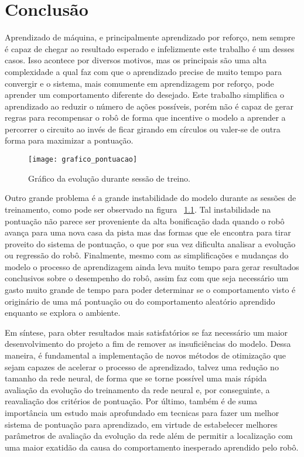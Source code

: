 

\chapter{Conclusão}
\label{cap:conclusao}

Aprendizado de máquina, e principalmente aprendizado por reforço, nem sempre é capaz de chegar ao resultado esperado e infelizmente este trabalho é um desses casos. Isso acontece por diversos motivos, mas os principais são uma alta complexidade a qual faz com que o aprendizado precise de muito tempo para convergir e o sistema, mais comumente em aprendizagem por reforço, pode aprender um comportamento diferente do desejado. Este trabalho simplifica o aprendizado ao reduzir o número de ações possíveis, porém não é capaz de gerar regras para recompensar o robô de forma que incentive o modelo a aprender a percorrer o circuito ao invés de ficar girando em círculos ou valer-se de outra forma para maximizar a pontuação.

\begin{figure}
	\centering
	\texttt{[image: grafico\_pontuacao]}
	\caption{Gráfico da evolução durante sessão de treino. \label{fig:grafico_pontuacao}}
\end{figure}

Outro grande problema é a grande instabilidade do modelo durante as sessões de treinamento, como pode ser observado na figura ~\ref{fig:grafico_pontuacao}. Tal instabilidade na pontuação não parece ser proveniente da alta bonificação dada quando o robô avança para uma nova casa da pista mas das formas que ele encontra para tirar proveito do sistema de pontuação, o que por sua vez dificulta analisar a evolução ou regressão do robô. Finalmente, mesmo com as simplificações e mudanças do modelo o processo de aprendizagem ainda leva muito tempo para gerar resultados conclusivos sobre o desempenho do robô, assim faz com que seja necessário um gasto muito grande de tempo para poder determinar se o comportamento visto é originário de uma má pontuação ou do comportamento aleatório aprendido enquanto se explora o ambiente.

Em síntese, para obter resultados mais satisfatórios se faz necessário um maior desenvolvimento do projeto a fim de remover as insuficiências do modelo. Dessa maneira, é fundamental a implementação de novos métodos de otimização que sejam capazes de acelerar o processo de aprendizado, talvez uma redução no tamanho da rede neural, de forma que se torne possível uma mais rápida avaliação da evolução do treinamento da rede neural e, por conseguinte, a reavaliação dos critérios de pontuação. Por último, também é de suma importância um estudo mais aprofundado em tecnicas para fazer um melhor sistema de pontuação para aprendizado, em virtude de estabelecer melhores parâmetros de avaliação da evolução da rede além de permitir a localização com uma maior exatidão da causa do comportamento inesperado aprendido pelo robô.
